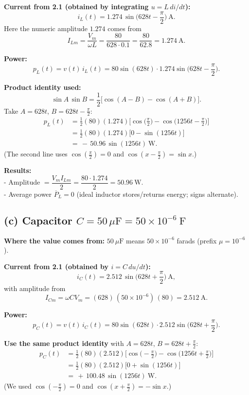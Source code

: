 \documentclass{article}
\begin{document}
\noindent\textbf{Current from 2.1 (obtained by integrating $u=L\,di/dt$):}
\[
i_L(t)=1.274\,\sin\!\Big(628t-\frac{\pi}{2}\Big)\ \text{A}.
\]
Here the numeric amplitude \(1.274\) comes from
\[
I_{Lm}=\frac{V_m}{\omega L}=\frac{80}{628\cdot 0.1}=\frac{80}{62.8}=1.274\ \text{A}.
\]

\noindent\textbf{Power:}
\[
p_L(t)=v(t)\,i_L(t)=80\sin(628t)\cdot 1.274\sin\!\Big(628t-\frac{\pi}{2}\Big).
\]

\noindent\textbf{Product identity used:}
\[
\sin A\,\sin B=\frac{1}{2}\big[\cos(A-B)-\cos(A+B)\big].
\]
Take \(A=628t\), \(B=628t-\tfrac{\pi}{2}\):
\[
\begin{aligned}
p_L(t)
&=\tfrac12(80)(1.274)\Big[\cos\!\Big(\tfrac{\pi}{2}\Big)-\cos\!\Big(1256t-\tfrac{\pi}{2}\Big)\Big]\\
&=\tfrac12(80)(1.274)\big[0-\sin(1256t)\big]\\
&=\boxed{\, -\,50.96\,\sin(1256t)\ \text{W}.}
\end{aligned}
\]
(The second line uses \(\cos(\tfrac{\pi}{2})=0\) and \(\cos(x-\tfrac{\pi}{2})=\sin x\).)

\noindent\textbf{Results:}
\\
- Amplitude \(= \dfrac{V_m I_{Lm}}{2}=\dfrac{80\cdot1.274}{2}=50.96\ \text{W}\).
\\
- Average power \(\overline P_L=0\) (ideal inductor stores/returns energy; signs alternate).

\vspace{0.8em}
\subsection*{(c) Capacitor $C=50\,\mu\text{F}=50\times10^{-6}\ \text{F}$}

\noindent\textbf{Where the value comes from:} \(50~\mu\text{F}\) means \(50\times 10^{-6}\) farads (prefix \(\mu=10^{-6}\)).

\noindent\textbf{Current from 2.1 (obtained by $i=C\,du/dt$):}
\[
i_C(t)=2.512\,\sin\!\Big(628t+\frac{\pi}{2}\Big)\ \text{A},
\]
with amplitude from
\[
I_{Cm}=\omega C V_m=(628)\,(50\times10^{-6})\,(80)=2.512\ \text{A}.
\]

\noindent\textbf{Power:}
\[
p_C(t)=v(t)\,i_C(t)=80\sin(628t)\cdot 2.512\sin\!\Big(628t+\frac{\pi}{2}\Big).
\]

\noindent\textbf{Use the same product identity} with \(A=628t\), \(B=628t+\tfrac{\pi}{2}\):
\[
\begin{aligned}
p_C(t)
&=\tfrac12(80)(2.512)\Big[\cos\!\Big(-\tfrac{\pi}{2}\Big)-\cos\!\Big(1256t+\tfrac{\pi}{2}\Big)\Big]\\
&=\tfrac12(80)(2.512)\big[0+\sin(1256t)\big]\\
&=\boxed{\, +\,100.48\,\sin(1256t)\ \text{W}.}
\end{aligned}
\]
(We used \(\cos(-\tfrac{\pi}{2})=0\) and \(\cos(x+\tfrac{\pi}{2})=-\sin x\).)
\end{document}
